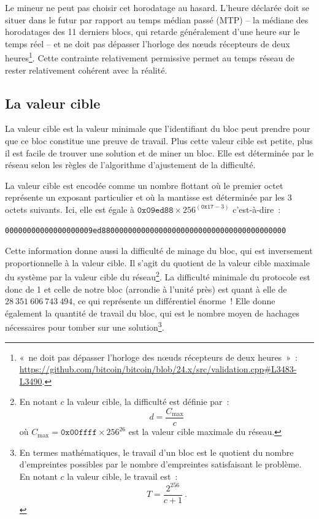 \clearpage
Le mineur ne peut pas choisir cet horodatage au hasard. L'heure déclarée doit se situer dans le futur par rapport au temps médian passé (MTP) -- la médiane des horodatages des 11 derniers blocs, qui retarde généralement d'une heure sur le temps réel -- et ne doit pas dépasser l'horloge des nœuds récepteurs de deux heures\footnote{«~ne doit pas dépasser l'horloge des nœuds récepteurs de deux heures~»~: \url{https://github.com/bitcoin/bitcoin/blob/24.x/src/validation.cpp\#L3483-L3490}.}. Cette contrainte relativement permissive permet au temps réseau de rester relativement cohérent avec la réalité.


\subsection{La valeur cible} La valeur cible est la valeur minimale que l'identifiant du bloc peut prendre pour que ce bloc constitue une preuve de travail. Plus cette valeur cible est petite, plus il est facile de trouver une solution et de miner un bloc. Elle est déterminée par le réseau selon les règles de l'algorithme d'ajustement de la difficulté.

La valeur cible est encodée comme un nombre flottant où le premier octet représente un exposant particulier et où la mantisse est déterminée par les 3 octets suivants. Ici, elle est égale à $\mathtt{0x09ed88} \times 256^{(\mathtt{0x17} - 3)}$ c'est-à-dire~:

\begin{Verbatim}[fontsize=\footnotesize]
00000000000000000009ed880000000000000000000000000000000000000000
\end{Verbatim}

Cette information donne aussi la difficulté de minage du bloc, qui est inversement proportionnelle à la valeur cible. Il s'agit du quotient de la valeur cible maximale du système par la valeur cible du réseau\footnote{En notant $c$ la valeur cible, la difficulté est définie par~: \[ d = \frac{C_{\mathrm{max}}}{c} \] où $C_{\mathrm{max}} = \mathtt{0x00ffff} \times 256^{26}$ est la valeur cible maximale du réseau.}. La difficulté minimale du protocole est donc de 1 et celle de notre bloc (arrondie à l'unité près) est quant à elle de $28~351~606~743~494$, ce qui représente un différentiel énorme~! Elle donne également la quantité de travail du bloc, qui est le nombre moyen de hachages nécessaires pour tomber sur une solution\footnote{En termes mathématiques, le travail d'un bloc est le quotient du nombre d'empreintes possibles par le nombre d'empreintes satisfaisant le problème. En notant $c$ la valeur cible, le travail est~: \[ T = \frac{2^{256}}{c + 1} ~.\]}.

